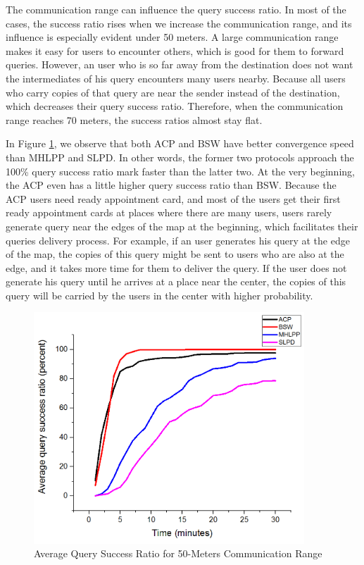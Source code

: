 The communication range can influence the query success ratio. In most of the cases, the success ratio rises when we increase the communication range, and its influence is especially evident under 50 meters. A large communication range makes it easy for users to encounter others, which is good for them to forward queries. However, an user who is so far away from the destination does not want the intermediates of his query encounters many users nearby. Because all users who carry copies of that query are near the sender instead of the destination, which decreases their query success ratio. Therefore, when the communication range reaches 70 meters, the success ratios almost stay flat.

In Figure \ref{fig:F416AverageQuerySuccessRatioWith50MetersCommunicationRatio}, we observe that both ACP and BSW have better convergence speed than MHLPP and SLPD. In other words, the former two protocols approach the 100\% query success ratio mark faster than the latter two. At the very beginning, the ACP even has a little higher query success ratio than BSW. Because the ACP users need ready appointment card, and most of the users get their first ready appointment cards at places where there are many users, users rarely generate query near the edges of the map at the beginning, which facilitates their queries delivery process. For example, if an user generates his query at the edge of the map, the copies of this query might be sent to users who are also at the edge, and it takes more time for them to deliver the query. If the user does not generate his query until he arrives at a place near the center, the copies of this query will be carried by the users in the center with higher probability.

\begin{figure} [hbtp]
  \centering 
  \includegraphics[width=4.0in]{figures/F416AverageQuerySuccessRatioWith50MetersCommunicationRatio.png}
  \caption{Average Query Success Ratio for 50-Meters Communication Range} 
  \label{fig:F416AverageQuerySuccessRatioWith50MetersCommunicationRatio} %
\end{figure}


